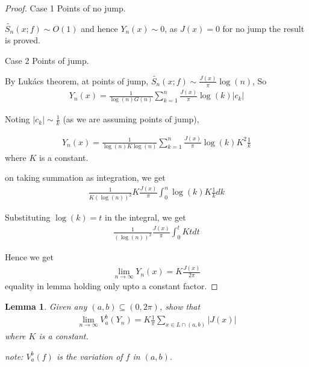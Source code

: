 \documentclass{amsart}
\newtheorem{lemma}[theorem]{Lemma}
\theoremstyle{definition}
\theoremstyle{remark}
\numberwithin{equation}{section}
\begin{document}
\begin{proof}
Case 1 Points of no jump.
  
$\tilde{S_n}(x;f)\sim O(1)$ and hence $Y_n(x)\sim 0$, as $J(x) = 0$ for no jump the result is proved.

Case 2 Points of jump.

By Lukács theorem\cite{Lukács1920}, at points of jump, $\tilde{S_n}(x;f)\sim \frac{J(x)}{\pi}\log(n)$,
So
\begin{equation}\begin{aligned}
Y_n(x) = \frac{1}{\log(n)G(n)}\sum\limits_{k=1}^n\frac{J(x)}{\pi}\log(k)|c_k|
\end{aligned}\end{equation}

Noting $|c_k|\sim\frac{1}{k}$ (as we are assuming points of jump), 

\begin{equation}\begin{aligned}
Y_n(x) = \frac{1}{\log(n)K\log(n)}\sum\limits_{k=1}^n\frac{J(x)}{\pi}\log(k)K^2\frac{1}{k}
\end{aligned}\end{equation}
 where $K$ is a constant.

on taking summation as integration, we get 
\begin{equation}\begin{aligned}
\frac{1}{K(\log(n))^2}K\frac{J(x)}{\pi}\int_0^n\log(k)K\frac{1}{k}dk
\end{aligned}\end{equation} 

Substituting $\log(k) = t$ in the integral, we get 
\begin{equation}\begin{aligned}
\frac{1}{(\log(n))^2}\frac{J(x)}{\pi}\int_0^t Ktdt
\end{aligned}\end{equation} 

Hence we get \begin{equation}\begin{aligned}
\lim_{n\to\infty}Y_n(x) = K \frac{J(x)}{2\pi}
\end{aligned}\end{equation}
equality in lemma holding only upto a constant factor. 

\end{proof}

\begin{lemma}
Given any $(a,b)\subseteq (0,2\pi)$, show that
\begin{equation}\begin{aligned}
\lim_{n\to\infty}V_a^b(Y_n) = K \frac{1}{\pi}\sum_{x\in L\cap (a,b)}\left|J(x)\right|
\end{aligned}\end{equation} where $K$ is a constant.


note: $V_a^b(f)$ is the variation of $f$ in $(a,b)$.

\end{lemma}
\end{document}
